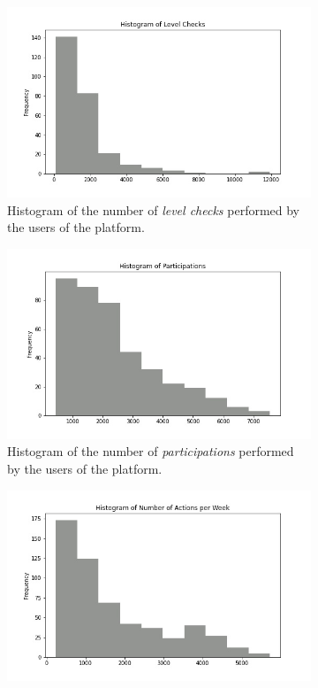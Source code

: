 \documentclass[sigplan,screen]{acmart}
\begin{document}
\begin{figure}
     \centering
     \begin{subfigure}[b]{\linewidth}
         \centering
         \includegraphics[width=0.82\linewidth]{reports/figures/histogram_level_checks.jpg}
         \caption{Histogram of the number of \emph{level checks} performed by the users of the platform.}
         \label{fig:level_cheks}
     \end{subfigure}
     \hfill
     \begin{subfigure}[b]{\linewidth}
         \centering
         \includegraphics[width=0.82\linewidth]{reports/figures/histogram_num_participations.jpg}
         \caption{Histogram of the number of \emph{participations} performed by the users of the platform.}
         \label{fig:participations}
     \end{subfigure}
     \medskip
     \begin{subfigure}[b]{\linewidth}
         \centering
         \includegraphics[width=0.82\linewidth]{reports/figures/histogram_number_of_actions_per_week.jpg}

\end{subfigure}
\end{figure}
\end{document}
